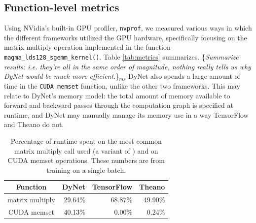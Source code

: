 \documentclass{article}
\newcommand{\ms}[1]{{\color{cyan}\{\textit{#1}\}$_{ms}$}}
\begin{document}
\subsection{Function-level metrics}
Using NVidia's built-in GPU profiler, \verb!nvprof!, we measured various ways in which the different frameworks utilized the GPU hardware, specifically focusing on the matrix multiply operation implemented in the function \verb!magma_lds128_sgemm_kernel()!. Table \ref{tab:metrics} summarizes. \ms{Summarize results: i.e. they're all in the same order of magnitude, nothing really tells us why DyNet would be much more efficient.} DyNet also spends a large amount of time in the \texttt{CUDA memset} function, unlike the other two frameworks. This may relate to DyNet's memory model: the total amount of memory available to forward and backward passes through the computation graph is specified at runtime, and DyNet may manually manage its memory use in a way TensorFlow and Theano do not.

\begin{table}
\centering
\begin{tabular}{c|rrr}
\textbf{Function} & DyNet &  TensorFlow & Theano \\  
\hline
matrix multiply & 29.64\%  &  68.87\% & 49.90\% \\
\hline
CUDA memset & 40.13\% & 0.00\% & 0.24\% \\
\end{tabular}

\caption{\label{tab:pcttime}Percentage of runtime spent on the most common matrix multiply call used (a variant of \texttt{}) and on CUDA memset operations. These numbers are from training on a single batch.}
\end{table}
\end{document}

